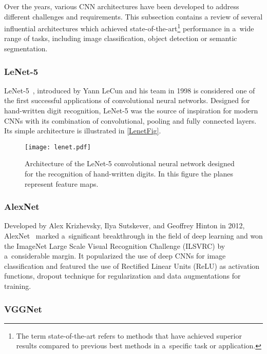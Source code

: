 Over the years, various CNN architectures have been developed to address
different challenges and requirements. This subsection contains a review of several
influential architectures which achieved state-of-the-art\footnote{The term
state-of-the-art refers to methods that have achieved superior results
compared to previous best methods in a~specific task or application.}
performance in a~wide range of tasks, including image classification, object
detection or semantic segmentation.


\subsubsection{LeNet-5}

LeNet-5~\cite{Lecun1998}, introduced by Yann LeCun and his team in 1998 is
considered one of the first successful applications of convolutional neural
networks. Designed for hand-written digit recognition, LeNet-5 was the source of
inspiration for modern CNNs with its combination of convolutional, pooling and
fully connected layers. Its simple architecture is illustrated in
\autoref{LenetFig}.

\begin{figure}[t]
    \centering
    \texttt{[image: lenet.pdf]}
    \captionsetup{width=\textwidth}
    \caption{Architecture of the LeNet-5 convolutional neural network designed
    for the recognition of hand-written digits. In this figure the planes represent
    feature maps.~\cite{Lecun1998}}
    \label{LenetFig}
\end{figure}


\subsubsection{AlexNet}

Developed by Alex Krizhevsky, Ilya Sutskever, and Geoffrey Hinton in 2012,
AlexNet~\cite{NIPS2012} marked a~significant breakthrough in the field of deep
learning and won the ImageNet Large Scale Visual Recognition Challenge (ILSVRC)
by a~considerable margin. It popularized the use of deep CNNs for image
classification and featured the use of Rectified Linear Units (ReLU) as
activation functions, dropout technique for regularization and data
augmentations for training.


\subsubsection{VGGNet}


